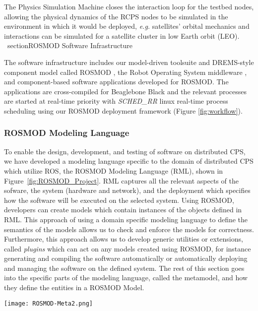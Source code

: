 The Physics Simulation Machine closes the interaction loop for the testbed nodes, allowing the physical dynamics of the RCPS nodes to be simulated in the environment in which it would be deployed, \emph{e.g.} satellites' orbital mechanics and interactions can be simulated for a satellite cluster in low Earth orbit (LEO). 
\
section{ROSMOD Software Infrastructure}

The software infrastructure includes our model-driven toolsuite and DREMS-style component model called ROSMOD \cite{kumarROSMOD}, the Robot Operating System middleware \cite{ROS}, and component-based software applications developed for ROSMOD. The applications are cross-compiled for Beaglebone Black and the relevant processes are started at real-time priority with \emph{SCHED\_RR} linux real-time process scheduling using our ROSMOD deployment framework (Figure \ref{fig:workflow}).

\subsubsection{ROSMOD Modeling Language}

To enable the design, development, and testing of software on distributed CPS, we have developed a modeling language specific to the domain of distributed CPS which utilize ROS, the ROSMOD Modeling Language (RML), shown in Figure~\ref{fig:ROSMOD_Project}. RML captures all the relevant aspects of the sofware, the system (hardware and network), and the deployment which specifies how the software will be executed on the selected system.  Using ROSMOD, developers can
create models which contain instances of the objects defined in RML. This approach of using a domain specific modeling language to define the semantics of the models allows us to check and enforce the models for correctness.  Furthermore, this approach allows us to develop generic utilities or extensions, called \emph{plugins} \cite{maroti2014next} which can act on any models created using ROSMOD, for instance generating and compiling the software automatically or automatically deploying and managing the software on the defined system. The rest of this section goes into the specific parts of the modeling language, called the metamodel, and how they define the entities in a ROSMOD Model.

\begin{figure*}[ht]
	\centering
	\texttt{[image: ROSMOD-Meta2.png]}
	\caption{ROSMOD Metamodel.  Containment is specified from \emph{src} to \emph{dst} where the source has a containment attribute \emph{quantity}, meaning that \emph{quantity} objects of type \emph{src} can be contained in an object of type \emph{dst}. Pointers are specified as a one to one mapping from source to destination, using the name of the pointer. Sets allow for pointer containment. All objects contain a \emph{name} attribute of type \emph{string}, not shown for clarity.  Note: the metamodel is used to create the ROSMOD Modeling Language, but users do not see or interact with it; it is used to enforce proper model creation semantics.}
	\label{fig:ROSMOD_Project}	
\end{figure*}
\FloatBarrier

